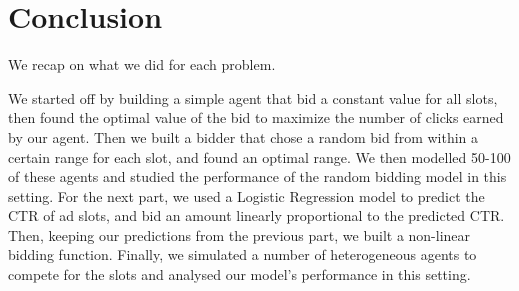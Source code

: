 \documentclass{sig-alternate-05-2015}
\begin{document}
\section{Conclusion}

We recap on what we did for each problem.

We started off by building a simple agent that bid a constant value for all slots, then found the optimal value of the bid to maximize the number of clicks earned by our agent.
Then we built a bidder that chose a random bid from within a certain range for each slot, and found an optimal range.
We then modelled 50-100 of these agents and studied the performance of the random bidding model in this setting.
For the next part, we used a Logistic Regression model to predict the CTR of ad slots, and bid an amount linearly proportional to the predicted CTR.
Then, keeping our predictions from the previous part, we built a non-linear bidding function.
Finally, we simulated a number of heterogeneous agents to compete for the slots and analysed our model's performance in this setting.

%








%
\end{document}
